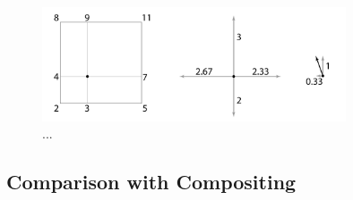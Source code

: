 

\begin{figure}[h!]
    \centering
    \captionsetup{justification=centering,margin=0.5cm}
    \includegraphics[width=0.8\textwidth]{img/local_gradient_vector.pdf}
    \caption{...}
    \label{fig:vector}
\end{figure}


\subsection{Comparison with Compositing}\label{subsec:opacity_compare}
